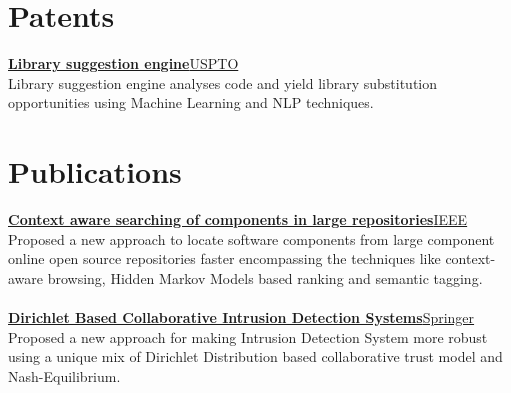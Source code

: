 \documentclass[margin,line]{resume}
\begin{document}
\begin{resume}
\section{\mysidestyle \bf Patents}
 {\bf\href{https://patents.google.com/patent/US10048945B1/}{Library suggestion engine}}\hfill \href{https://www.uspto.gov/}{USPTO} \\
Library suggestion engine analyses code and yield library substitution opportunities using Machine Learning and NLP techniques.

\section{\mysidestyle \bf Publications}
 {\bf\href{http://ieeexplore.ieee.org/document/7148513/?arnumber=7148513}{Context aware searching of components in large repositories}}\hfill \href{https://www.ieee.org/}{IEEE} \\
Proposed a new approach to locate software components from large component online open source repositories faster encompassing the techniques like context-aware browsing, Hidden Markov Models based ranking and semantic tagging.\\\\
    {\bf\href{http://link.springer.com/chapter/10.1007/978-981-10-0251-9_32}{Dirichlet Based Collaborative Intrusion Detection Systems}}\hfill \href{https://www.springer.com}{Springer} \\
Proposed a new approach for making Intrusion Detection System more robust using a unique mix of Dirichlet Distribution based collaborative trust model and Nash-Equilibrium.
\pagebreak

\end{resume}
\end{document}
